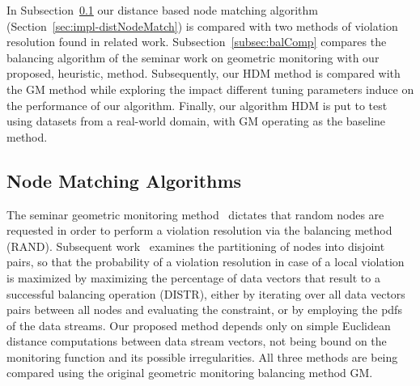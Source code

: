 In Subsection~\ref{subsec:matchingComp} our distance based node matching algorithm (Section~\ref{sec:impl-distNodeMatch}) is compared with two methods of violation resolution found in related work. Subsection~\ref{subsec:balComp} compares the balancing algorithm of the seminar work on geometric monitoring with our proposed, heuristic, method. Subsequently, our HDM method is compared with the GM method while exploring the impact different tuning parameters induce on the performance of our algorithm. Finally, our algorithm HDM is put to test using datasets from a real-world domain, with GM operating as the baseline method.

\subsection{Node Matching Algorithms} \label{subsec:matchingComp}

The seminar geometric monitoring method~\cite{Sharfman2006GM} dictates that random nodes are requested in order to perform a violation resolution via the balancing method (RAND). Subsequent work~\cite{Keren2014GMHetStreams} examines the partitioning of nodes into disjoint pairs, so that the probability of a violation resolution in case of a local violation is maximized by maximizing the percentage of data vectors that result to a successful balancing operation (DISTR), either by iterating over all data vectors pairs between all nodes and evaluating the constraint, or by employing the pdfs of the data streams. Our proposed method depends only on simple Euclidean distance computations between data stream vectors, not being bound on the monitoring function and its possible irregularities. All three methods are being compared using the original geometric monitoring balancing method GM.

